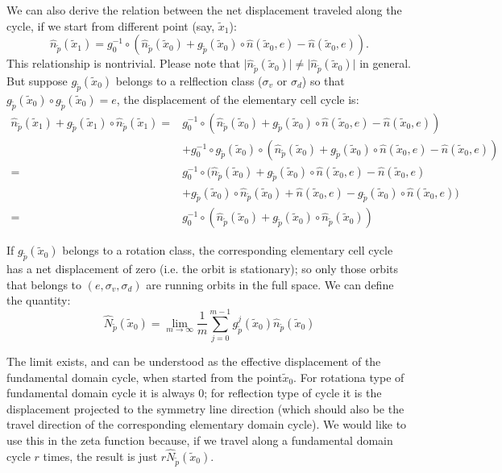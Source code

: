 \begin{description}
We can also derive the relation between the net displacement traveled
along the cycle, if we start from different point (say, $\tilde{x}_{1}$):
\[
\hat{n}_{\tilde{p}}(\tilde{x}_{1})=g_{0}^{-1}\circ\left(\hat{n}_{\tilde{p}}(\tilde{x}_{0})+g_{\tilde{p}}(\tilde{x}_{0})\circ\hat{n}(\tilde{x}_{0},e)-\hat{n}(\tilde{x}_{0},e)\right).
\]
This relationship is nontrivial. Please note that $\vert\hat{n}_{\tilde{p}}(\tilde{x}_{0})\vert\neq\vert\hat{n}_{\tilde{p}}(\tilde{x}_{0})\vert$
in general. But suppose $g_{\tilde{p}}(\tilde{x}_{0})$ belongs to
a relflection class ($\sigma_{v}$ or $\sigma_{d}$) so that $g_{\tilde{p}}(\tilde{x}_{0})\circ g_{\tilde{p}}(\tilde{x}_{0})=e$,
the displacement of the elementary cell cycle is:
\begin{align*}
\hat{n}_{\tilde{p}}(\tilde{x}_{1})+g_{\tilde{p}}(\tilde{x}_{1})\circ\hat{n}_{\tilde{p}}(\tilde{x}_{1})= & g_{0}^{-1}\circ\left(\hat{n}_{\tilde{p}}(\tilde{x}_{0})+g_{\tilde{p}}(\tilde{x}_{0})\circ\hat{n}(\tilde{x}_{0},e)-\hat{n}(\tilde{x}_{0},e)\right)\\
 & +g_{0}^{-1}\circ g_{\tilde{p}}(\tilde{x}_{0})\circ\left(\hat{n}_{\tilde{p}}(\tilde{x}_{0})+g_{\tilde{p}}(\tilde{x}_{0})\circ\hat{n}(\tilde{x}_{0},e)-\hat{n}(\tilde{x}_{0},e)\right)\\
= & g_{0}^{-1}\circ(\hat{n}_{\tilde{p}}(\tilde{x}_{0})+g_{\tilde{p}}(\tilde{x}_{0})\circ\hat{n}(\tilde{x}_{0},e)-\hat{n}(\tilde{x}_{0},e)\\
 & +g_{\tilde{p}}(\tilde{x}_{0})\circ\hat{n}_{\tilde{p}}(\tilde{x}_{0})+\hat{n}(\tilde{x}_{0},e)-g_{\tilde{p}}(\tilde{x}_{0})\circ\hat{n}(\tilde{x}_{0},e))\\
= & g_{0}^{-1}\circ\left(\hat{n}_{\tilde{p}}(\tilde{x}_{0})+g_{\tilde{p}}(\tilde{x}_{0})\circ\hat{n}_{\tilde{p}}(\tilde{x}_{0})\right)
\end{align*}


If $g_{\tilde{p}}(\tilde{x}_{0})$ belongs to a rotation class, the
corresponding elementary cell cycle has a net displacement of zero
(i.e. the orbit is stationary); so only those orbits that belongs
to $(e,\sigma_{v},\sigma_{d})$ are running orbits in the full space.
We can define the quantity:
\[
\hat{N}_{\tilde{p}}(\tilde{x}_{0})=\lim_{m\to\infty}\frac{1}{m}\sum_{j=0}^{m-1}g_{\tilde{p}}^{j}(\tilde{x}_{0})\hat{n}_{\tilde{p}}(\tilde{x}_{0})
\]


The limit exists, and can be understood as the effective displacement
of the fundamental domain cycle, when started from the point$\tilde{x}_{0}$.
For rotationa type of fundamental domain cycle it is always $0$;
for reflection type of cycle it is the displacement projected to the
symmetry line direction (which should also be the travel direction
of the corresponding elementary domain cycle). We would like to use
this in the zeta function because, if we travel along a fundamental
domain cycle $r$ times, the result is just $r\hat{N}_{\tilde{p}}(\tilde{x}_{0})$.


\end{description}
